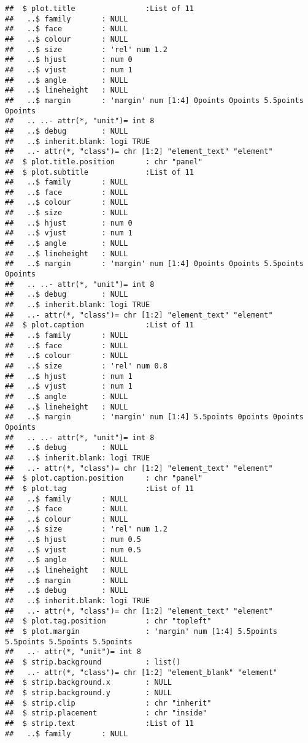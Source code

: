 \documentclass[
]{article}
\begin{document}
\begin{verbatim}
##  $ plot.title                :List of 11
##   ..$ family       : NULL
##   ..$ face         : NULL
##   ..$ colour       : NULL
##   ..$ size         : 'rel' num 1.2
##   ..$ hjust        : num 0
##   ..$ vjust        : num 1
##   ..$ angle        : NULL
##   ..$ lineheight   : NULL
##   ..$ margin       : 'margin' num [1:4] 0points 0points 5.5points 0points
##   .. ..- attr(*, "unit")= int 8
##   ..$ debug        : NULL
##   ..$ inherit.blank: logi TRUE
##   ..- attr(*, "class")= chr [1:2] "element_text" "element"
##  $ plot.title.position       : chr "panel"
##  $ plot.subtitle             :List of 11
##   ..$ family       : NULL
##   ..$ face         : NULL
##   ..$ colour       : NULL
##   ..$ size         : NULL
##   ..$ hjust        : num 0
##   ..$ vjust        : num 1
##   ..$ angle        : NULL
##   ..$ lineheight   : NULL
##   ..$ margin       : 'margin' num [1:4] 0points 0points 5.5points 0points
##   .. ..- attr(*, "unit")= int 8
##   ..$ debug        : NULL
##   ..$ inherit.blank: logi TRUE
##   ..- attr(*, "class")= chr [1:2] "element_text" "element"
##  $ plot.caption              :List of 11
##   ..$ family       : NULL
##   ..$ face         : NULL
##   ..$ colour       : NULL
##   ..$ size         : 'rel' num 0.8
##   ..$ hjust        : num 1
##   ..$ vjust        : num 1
##   ..$ angle        : NULL
##   ..$ lineheight   : NULL
##   ..$ margin       : 'margin' num [1:4] 5.5points 0points 0points 0points
##   .. ..- attr(*, "unit")= int 8
##   ..$ debug        : NULL
##   ..$ inherit.blank: logi TRUE
##   ..- attr(*, "class")= chr [1:2] "element_text" "element"
##  $ plot.caption.position     : chr "panel"
##  $ plot.tag                  :List of 11
##   ..$ family       : NULL
##   ..$ face         : NULL
##   ..$ colour       : NULL
##   ..$ size         : 'rel' num 1.2
##   ..$ hjust        : num 0.5
##   ..$ vjust        : num 0.5
##   ..$ angle        : NULL
##   ..$ lineheight   : NULL
##   ..$ margin       : NULL
##   ..$ debug        : NULL
##   ..$ inherit.blank: logi TRUE
##   ..- attr(*, "class")= chr [1:2] "element_text" "element"
##  $ plot.tag.position         : chr "topleft"
##  $ plot.margin               : 'margin' num [1:4] 5.5points 5.5points 5.5points 5.5points
##   ..- attr(*, "unit")= int 8
##  $ strip.background          : list()
##   ..- attr(*, "class")= chr [1:2] "element_blank" "element"
##  $ strip.background.x        : NULL
##  $ strip.background.y        : NULL
##  $ strip.clip                : chr "inherit"
##  $ strip.placement           : chr "inside"
##  $ strip.text                :List of 11
##   ..$ family       : NULL

\end{verbatim}
\end{document}
